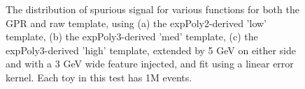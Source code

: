 \begin{figure} 
\begin{center}

\caption{The distribution of spurious signal for various functions for both the GPR and raw template, using (a) the expPoly2-derived 'low' template, (b) the expPoly3-derived 'med' template, (c) the expPoly3-derived 'high' template, extended by 5 GeV on either side and with a 3 GeV wide feature injected, and fit using a linear error kernel. Each toy in this test has 1M events.}
\label{fig:linearkernel_lowpt_1M_Sig_1s}
\end{center}
\end{figure}

